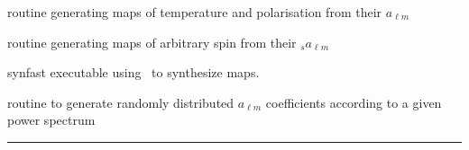 \begin{related}
  \begin{sulist}{} %
   \item[\htmlref{alm2map}{sub:alm2map}] routine generating maps of temperature
   and polarisation from their  $a_{\ell m}$
   \item[\htmlref{alm2map\_spin}{sub:alm2map_spin}] routine generating maps of
arbitrary spin from their  ${_s}a_{\ell m}$
  \item[synfast] executable using \thedocid\ to synthesize maps.
  \item[\htmlref{create\_alm}{sub:create_alm}] routine to generate randomly
  distributed $a_{\ell m}$ coefficients according to a given power spectrum
  \end{sulist}
\end{related}

\rule{\hsize}{2mm}

\newpage
